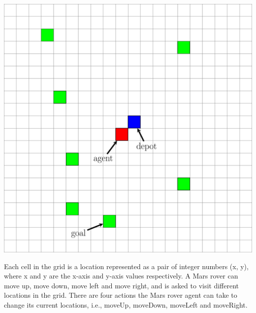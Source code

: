 \documentclass[portrait, plainsections]{sciposter}
\begin{document}
\begin{multicols}{3}
\begin{center}\vspace{1cm}
\includegraphics[scale=1]{./figs/mg_example.pdf}
\label{fig:marsrover}
\end{center}\vspace{1cm}
Each cell in the grid is a location represented as a pair of integer numbers (x, y), where x and y are the x-axis and y-axis values respectively.
%
% 
A Mars rover can move up, move down, move left and move right, and is asked to visit different locations in the grid.
There are four actions the Mars rover agent can take to change its current locations, i.e., moveUp, moveDown, moveLeft and moveRight.%
% 
%


\end{multicols}
\end{document}
